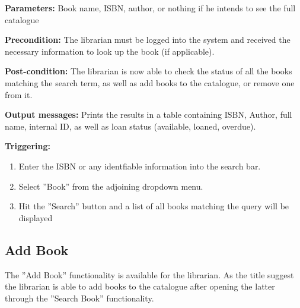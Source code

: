 \begin{description}

\item \textbf{Parameters:} Book name, ISBN, author, or nothing if he intends to
see the full catalogue

\item \textbf{Precondition:} The librarian must be logged into the system and
received the necessary information to look up the book (if applicable).

\item \textbf{Post-condition:} The librarian is now able to check the status of
all the books matching the search term, as well as add books to the catalogue,
or remove one from it.

\item \textbf{Output messages:} Prints the results in a table containing ISBN,
Author, full name, internal ID, as well as loan status (available, loaned,
overdue).

\item \textbf{Triggering:}
\begin{enumerate}
\item Enter the ISBN or any identfiable information into the search bar.
\item Select ''Book'' from the adjoining dropdown menu.
\item Hit the ''Search'' button and a list of all books matching the query
will be displayed
\end{enumerate}

\end{description}

\subsection{Add Book}

The ''Add Book'' functionality is available for the librarian. As the title
suggest the librarian is able to add books to the catalogue after opening the
latter through the ''Search Book'' functionality.

